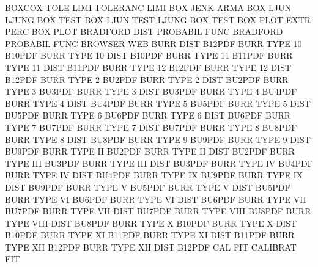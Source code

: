 BOXCOX   TOLE LIMI                      TOLERANC LIMI
BOX      JENK                           ARMA
BOX      LJUN                           LJUNG    BOX  TEST
BOX      LJUN TEST                      LJUNG    BOX  TEST
BOX      PLOT EXTR PERC                 BOX      PLOT
BRADFORD DIST                           PROBABIL FUNC
BRADFORD                                PROBABIL FUNC
BROWSER                                 WEB
BURR     DIST                           B12PDF
BURR     TYPE 10                        B10PDF
BURR     TYPE 10   DIST                 B10PDF
BURR     TYPE 11                        B11PDF
BURR     TYPE 11   DIST                 B11PDF
BURR     TYPE 12                        B12PDF
BURR     TYPE 12   DIST                 B12PDF
BURR     TYPE 2                         BU2PDF
BURR     TYPE 2    DIST                 BU2PDF
BURR     TYPE 3                         BU3PDF
BURR     TYPE 3    DIST                 BU3PDF
BURR     TYPE 4                         BU4PDF
BURR     TYPE 4    DIST                 BU4PDF
BURR     TYPE 5                         BU5PDF
BURR     TYPE 5    DIST                 BU5PDF
BURR     TYPE 6                         BU6PDF
BURR     TYPE 6    DIST                 BU6PDF
BURR     TYPE 7                         BU7PDF
BURR     TYPE 7    DIST                 BU7PDF
BURR     TYPE 8                         BU8PDF
BURR     TYPE 8    DIST                 BU8PDF
BURR     TYPE 9                         BU9PDF
BURR     TYPE 9    DIST                 BU9PDF
BURR     TYPE II                        BU2PDF
BURR     TYPE II   DIST                 BU2PDF
BURR     TYPE III                       BU3PDF
BURR     TYPE III  DIST                 BU3PDF
BURR     TYPE IV                        BU4PDF
BURR     TYPE IV   DIST                 BU4PDF
BURR     TYPE IX                        BU9PDF
BURR     TYPE IX   DIST                 BU9PDF
BURR     TYPE V                         BU5PDF
BURR     TYPE V    DIST                 BU5PDF
BURR     TYPE VI                        BU6PDF
BURR     TYPE VI   DIST                 BU6PDF
BURR     TYPE VII                       BU7PDF
BURR     TYPE VII  DIST                 BU7PDF
BURR     TYPE VIII                      BU8PDF
BURR     TYPE VIII DIST                 BU8PDF
BURR     TYPE X                         B10PDF
BURR     TYPE X    DIST                 B10PDF
BURR     TYPE XI                        B11PDF
BURR     TYPE XI   DIST                 B11PDF
BURR     TYPE XII                       B12PDF
BURR     TYPE XII  DIST                 B12PDF
CAL                                     FIT
CALIBRAT                                FIT
